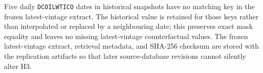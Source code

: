 Five daily \texttt{DCOILWTICO} dates in historical snapshots have no matching
key in the frozen latest-vintage extract. The historical value is retained for
those keys rather than interpolated or replaced by a neighbouring date; this
preserves exact mask equality and leaves no missing latest-vintage
counterfactual values. The frozen latest-vintage extract, retrieval metadata,
and SHA-256 checksum are stored with the replication artifacts so that later
source-database revisions cannot silently alter H3.
